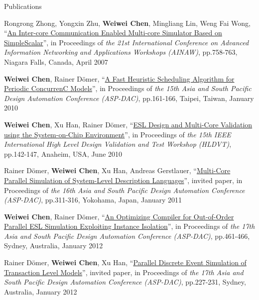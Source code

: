 \documentclass{resume} %
\newcommand{\mypubhl}[6]{
{#1}, {``\href{#2}{#3}''}, {#4}{\textit{#5}}, {#6}
\vspace{-0.5em}
}
\begin{document}
\begin{rSection}{Publications}
\begin{enumerate}
{\item
	\mypubhl
	{Rongrong Zhong, Yongxin Zhu, \textbf{Weiwei Chen}, Mingliang Lin, Weng Fai Wong}
	{http://www.cecs.uci.edu/~weiweic/publications/AINAW2007_RZ_YZ_WC_ML_WW.pdf}
	{An Inter-core Communication Enabled Multi-core Simulator Based on SimpleScalar} 
	{in Proceedings of }
	{the 21st International Conference on Advanced Information Networking and Applications Workshops (AINAW)}
	{pp.758-763, Niagara Falls, Canada, April 2007}
	
\item
	\mypubhl
	{\textbf{Weiwei Chen}, Rainer D\"{o}mer}
	{http://www.cecs.uci.edu/~doemer/publications/ASPDAC_10wc.pdf} 
	{A Fast Heuristic Scheduling Algorithm for Periodic ConcurrenC Models}
	{in Proceedings of }
	{the 15th Asia and South Pacific Design Automation Conference (ASP-DAC)}
	{pp.161-166, Taipei, Taiwan, January 2010}
	
\item
	\mypubhl
	{\textbf{Weiwei Chen}, Xu Han, Rainer D\"{o}mer}
	{http://www.cecs.uci.edu/~doemer/publications/HLDVT_10.pdf}
	{ESL Design and Multi-Core Validation using the System-on-Chip Environment}
	{in Proceedings of }
	{the 15th IEEE International High Level Design Validation and Test Workshop (HLDVT)}
	{pp.142-147, Anaheim, USA, June 2010}
	
	
\item
	\mypubhl
	{Rainer D\"{o}mer, \textbf{Weiwei Chen}, Xu Han, Andreas Gerstlauer}
	{http://www.cecs.uci.edu/~doemer/publications/ASPDAC_11.pdf}
	{Multi-Core Parallel Simulation of System-Level Description Languages}
	{invited paper, in Proceedings of }
	{the 16th Asia and South Pacific Design Automation Conference (ASP-DAC)}
	{pp.311-316, Yokohama, Japan, January 2011}
	
\item
	\mypubhl
	{\textbf{Weiwei Chen}, Rainer D\"{o}mer}
	{http://www.cecs.uci.edu/~doemer/publications/ASPDAC_12wc.pdf}
	{An Optimizing Compiler for Out-of-Order Parallel ESL Simulation Exploiting Instance Isolation}
	{in Proceedings of }
	{the 17th Asia and South Pacific Design Automation Conference (ASP-DAC)}
	{pp.461-466, Sydney, Australia, January 2012}
	
	
\item
	\mypubhl
	{Rainer D\"{o}mer, \textbf{Weiwei Chen}, Xu Han}
	{http://www.cecs.uci.edu/~doemer/publications/ASPDAC_12rd.pdf}
	{Parallel Discrete Event Simulation of Transaction Level Models}
	{invited paper, in Proceedings of }
	{the 17th Asia and South Pacific Design Automation Conference (ASP-DAC)}
	{pp.227-231, Sydney, Australia, January 2012}
	
}
\end{enumerate}
\end{rSection}
\end{document}
